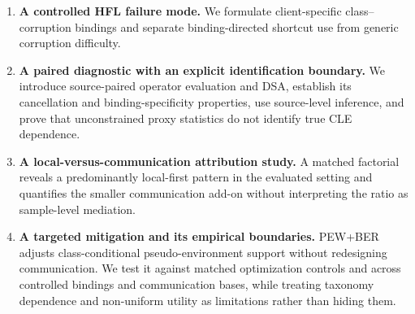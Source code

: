 \begin{enumerate}
\item \textbf{A controlled HFL failure mode.} We formulate client-specific class--corruption bindings and separate binding-directed shortcut use from generic corruption difficulty.
\item \textbf{A paired diagnostic with an explicit identification boundary.} We introduce source-paired operator evaluation and DSA, establish its cancellation and binding-specificity properties, use source-level inference, and prove that unconstrained proxy statistics do not identify true CLE dependence.
\item \textbf{A local-versus-communication attribution study.} A matched factorial reveals a predominantly local-first pattern in the evaluated setting and quantifies the smaller communication add-on without interpreting the ratio as sample-level mediation.
\item \textbf{A targeted mitigation and its empirical boundaries.} PEW+BER adjusts class-conditional pseudo-environment support without redesigning communication. We test it against matched optimization controls and across controlled bindings and communication bases, while treating taxonomy dependence and non-uniform utility as limitations rather than hiding them.
\end{enumerate}

\ifdraftskeleton
{}
\fi
